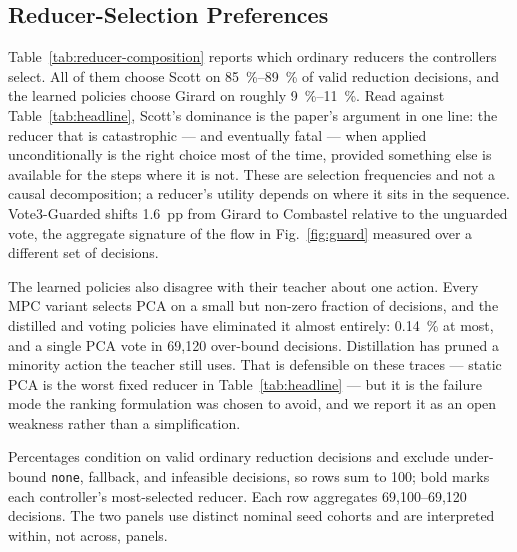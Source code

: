 \documentclass[letterpaper, 10 pt, conference]{ieeeconf}  %
\newcommand{\tablenote}[1]{%
  \par\vspace{3pt}%
  \begin{minipage}{\linewidth}\footnotesize\raggedright #1\end{minipage}%
}
\begin{document}
\subsection{Reducer-Selection Preferences}
\label{sec:eval-composition}
Table~\ref{tab:reducer-composition} reports which ordinary reducers the controllers select.
All of them choose Scott on \SIrange{85}{89}{\percent} of valid reduction decisions, and the learned policies choose Girard on roughly \SIrange{9}{11}{\percent}.
Read against Table~\ref{tab:headline}, Scott's dominance is the paper's argument in one line: the reducer that is catastrophic --- and eventually fatal --- when applied unconditionally is the right choice most of the time, provided something else is available for the steps where it is not.
These are selection frequencies and not a causal decomposition; a reducer's utility depends on where it sits in the sequence.
Vote3-Guarded shifts \SI{1.6}{pp} from Girard to Combastel relative to the unguarded vote, the aggregate signature of the flow in Fig.~\ref{fig:guard} measured over a different set of decisions.

The learned policies also disagree with their teacher about one action.
Every MPC variant selects PCA on a small but non-zero fraction of decisions, and the distilled and voting policies have eliminated it almost entirely: \SI{0.14}{\percent} at most, and a single PCA vote in 69{,}120 over-bound decisions.
Distillation has pruned a minority action the teacher still uses.
That is defensible on these traces --- static PCA is the worst fixed reducer in Table~\ref{tab:headline} --- but it is the failure mode the ranking formulation was chosen to avoid, and we report it as an open weakness rather than a simplification.

\begin{table}[t]
  \centering
  \caption{Pooled reducer-selection frequencies (\%)}
  \label{tab:reducer-composition}
  \small
  
  \tablenote{
    Percentages condition on valid ordinary reduction decisions and
        exclude under-bound \texttt{none}, fallback, and infeasible decisions, so
        rows sum to 100; bold marks each controller's most-selected reducer.
        Each row aggregates 69{,}100--69{,}120 decisions. The two
        panels use distinct nominal seed cohorts and are interpreted within, not
        across, panels.
  }
\end{table}
\end{document}
